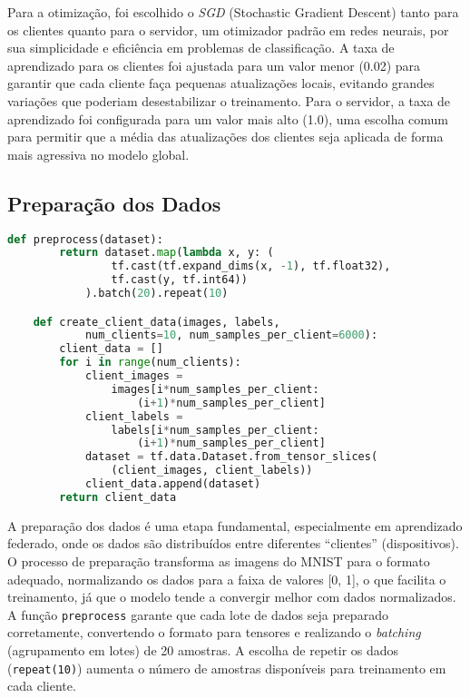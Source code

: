 Para a otimização, foi escolhido o \textit{SGD} (Stochastic Gradient Descent) tanto para os clientes quanto para o servidor, um otimizador padrão em redes neurais, por sua simplicidade e eficiência em problemas de classificação. A taxa de aprendizado para os clientes foi ajustada para um valor menor (0.02) para garantir que cada cliente faça pequenas atualizações locais, evitando grandes variações que poderiam desestabilizar o treinamento. Para o servidor, a taxa de aprendizado foi configurada para um valor mais alto (1.0), uma escolha comum para permitir que a média das atualizações dos clientes seja aplicada de forma mais agressiva no modelo global.

\subsection{Preparação dos Dados}

\begin{lstlisting}[language=Python, caption={Preparação dos dados}, label={lst:data_preparation}]
    def preprocess(dataset):
        return dataset.map(lambda x, y: (
                tf.cast(tf.expand_dims(x, -1), tf.float32), 
                tf.cast(y, tf.int64))
            ).batch(20).repeat(10)

    def create_client_data(images, labels, 
            num_clients=10, num_samples_per_client=6000):
        client_data = []
        for i in range(num_clients):
            client_images = 
                images[i*num_samples_per_client:
                    (i+1)*num_samples_per_client]
            client_labels = 
                labels[i*num_samples_per_client:
                    (i+1)*num_samples_per_client]
            dataset = tf.data.Dataset.from_tensor_slices(
                (client_images, client_labels))
            client_data.append(dataset)
        return client_data
\end{lstlisting}

A preparação dos dados é uma etapa fundamental, especialmente em aprendizado federado, onde os dados são distribuídos entre diferentes ``clientes'' (dispositivos). O processo de preparação transforma as imagens do MNIST para o formato adequado, normalizando os dados para a faixa de valores [0, 1], o que facilita o treinamento, já que o modelo tende a convergir melhor com dados normalizados. A função \texttt{preprocess} garante que cada lote de dados seja preparado corretamente, convertendo o formato para tensores e realizando o \textit{batching} (agrupamento em lotes) de 20 amostras. A escolha de repetir os dados (\texttt{repeat(10)}) aumenta o número de amostras disponíveis para treinamento em cada cliente. 

